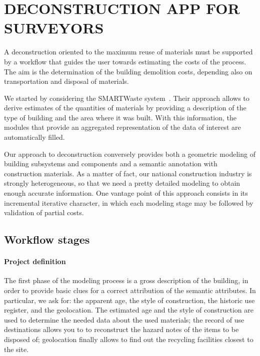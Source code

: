 \section{\uppercase{Deconstruction App for surveyors}}
\label{sec:application}

A deconstruction oriented to the maximum reuse of materials must be supported by a workflow that guides the user towards estimating the costs of the process. The aim is the determination of the building demolition costs, depending also on transportation  and disposal of materials.

We started by considering the SMARTWaste system~\cite{smartWaste}. Their approach allows to derive estimates of the quantities of materials by providing a description of the type of building and the area where it was built. With this information, the modules that provide an aggregated representation of the data of interest are automatically filled.

Our approach to deconstruction conversely provides both a geometric modeling of building subsystems and components and a semantic annotation with construction materials. As a matter of fact, our national construction industry is strongly heterogeneous, so that  we need a pretty detailed modeling to obtain enough accurate information.
One vantage point of this approach consists in its incremental iterative character, in which each modeling stage may be followed by validation of partial costs.

\subsection{Workflow stages}

\paragraph{Project definition} 

The first phase of the modeling process is a gross description of the building, in order to provide basic clues for a correct attribution of the semantic attributes.
In particular, we ask for: the apparent age, the style of construction, the historic use register, and the geolocation.
The estimated age and the style of construction are used to determine the needed data about the used materials; the record of use destinations allows you to to reconstruct the hazard notes of the items to be disposed of; geolocation finally allows to find out the recycling facilities closest to the site.

